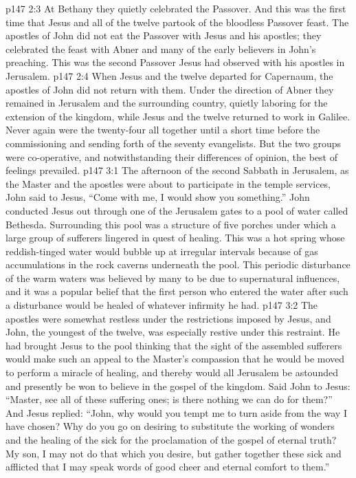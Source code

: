 \vs p147 2:3 At Bethany they quietly celebrated the Passover. And this was the first time that Jesus and all of the twelve partook of the bloodless Passover feast. The apostles of John did not eat the Passover with Jesus and his apostles; they celebrated the feast with Abner and many of the early believers in John’s preaching. This was the second Passover Jesus had observed with his apostles in Jerusalem.
\vs p147 2:4 When Jesus and the twelve departed for Capernaum, the apostles of John did not return with them. Under the direction of Abner they remained in Jerusalem and the surrounding country, quietly laboring for the extension of the kingdom, while Jesus and the twelve returned to work in Galilee. Never again were the twenty\hyp{}four all together until a short time before the commissioning and sending forth of the seventy evangelists. But the two groups were co\hyp{}operative, and notwithstanding their differences of opinion, the best of feelings prevailed.
\vs p147 3:1 The afternoon of the second Sabbath in Jerusalem, as the Master and the apostles were about to participate in the temple services, John said to Jesus, “Come with me, I would show you something.” John conducted Jesus out through one of the Jerusalem gates to a pool of water called Bethesda. Surrounding this pool was a structure of five porches under which a large group of sufferers lingered in quest of healing. This was a hot spring whose reddish\hyp{}tinged water would bubble up at irregular intervals because of gas accumulations in the rock caverns underneath the pool. This periodic disturbance of the warm waters was believed by many to be due to supernatural influences, and it was a popular belief that the first person who entered the water after such a disturbance would be healed of whatever infirmity he had.
\vs p147 3:2 The apostles were somewhat restless under the restrictions imposed by Jesus, and John, the youngest of the twelve, was especially restive under this restraint. He had brought Jesus to the pool thinking that the sight of the assembled sufferers would make such an appeal to the Master’s compassion that he would be moved to perform a miracle of healing, and thereby would all Jerusalem be astounded and presently be won to believe in the gospel of the kingdom. Said John to Jesus: “Master, see all of these suffering ones; is there nothing we can do for them?” And Jesus replied: \textcolor{ubdarkred}{“John, why would you tempt me to turn aside from the way I have chosen? Why do you go on desiring to substitute the working of wonders and the healing of the sick for the proclamation of the gospel of eternal truth? My son, I may not do that which you desire, but gather together these sick and afflicted that I may speak words of good cheer and eternal comfort to them.”}
